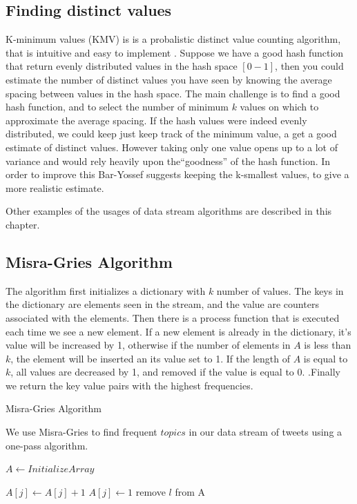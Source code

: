 \documentclass[12pt]{article}
\begin{document}
\subsection{Finding distinct values}
K-minimum values (KMV) is is a probalistic distinct value counting algorithm, that is intuitive and easy to implement \cite{kmv}. Suppose we have a good hash function that return evenly distributed values in the hash space $[0-1]$, then you could estimate the number of distinct values you have seen by knowing the average spacing between values in the hash space. The main challenge is to find a good hash function, and to select the number of minimum $k$ values on which to approximate the average spacing. If the hash values were indeed evenly distributed, we could keep just keep track of the minimum value, a get a good estimate of distinct values. However taking only one value opens up to a lot of variance and would rely heavily upon the``goodness'' of the hash function. In order to improve this Bar-Yossef\cite{Bar-Yossef} suggests keeping the k-smallest values, to give a more realistic estimate.
   
Other examples of the usages of data stream algorithms are described in this chapter.
\subsection{Misra-Gries Algorithm}
The algorithm first initializes a dictionary with $k$ number of values. The keys in the dictionary are elements seen in the stream, and the value are counters associated with the elements. Then there is a process function that is executed each time we see a new element. If a new element is already in the dictionary, it's value will be increased by 1, otherwise if the number of elements in $A$ is less than $k$, the element will be inserted an its value set to 1. If the length of $A$ is equal to $k$, all values are decreased by 1, and removed if the value is equal to 0. \cite{Amit}.Finally we return the key value pairs with the highest frequencies.
\begin{algorithm}
\caption{Misra-Gries Algorithm}
We use Misra-Gries to find frequent $topics$ in our data stream of tweets using a one-pass algorithm.
\begin{algorithmic}
\State $A\gets Initialize Array$

	\State $A[j] \leftarrow A[j] + 1$
	\State $A[j] \leftarrow 1$
\Else
		 remove $l$ from A
		\EndIf
	\EndFor
\EndIf
\EndFunction
\end{algorithmic}
\end{algorithm}
\end{document}
